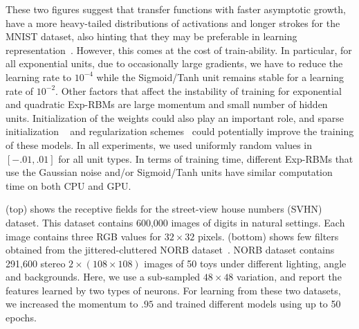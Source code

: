 \documentclass[twoside]{article}
\theoremstyle{plain}
\theoremstyle{definition}
\theoremstyle{remark}
\newcommand{\eg}[0]{\emph{e.g.},~}
\begin{document}
These two figures suggest that transfer functions with faster asymptotic growth, have a more heavy-tailed distributions of
activations and longer strokes for the MNIST dataset, also hinting that they may be preferable
in learning representation~\citep[\eg see][]{olshausen1997sparse}. However, this comes at the cost of train-ability.
In particular, for all exponential units, due to occasionally large gradients, we have to reduce the learning rate to $10^{-4}$ while the Sigmoid/Tanh unit remains stable for a learning rate of $10^{-2}$. Other factors that affect the instability of training for exponential and quadratic Exp-RBMs are large momentum and small number of hidden units. Initialization of the weights could also play an important role, and sparse initialization
 ~\citep{sutskever2013importance,martens2010deep} and regularization schemes~\citep{goodfellow2013maxout} could potentially improve the training of these models. In all experiments, we used uniformly random values in $[-.01,.01]$ for all unit types.
In terms of training time, different Exp-RBMs that use the Gaussian noise and/or Sigmoid/Tanh units have similar computation time on both CPU and GPU.


(top) shows the receptive fields for the street-view house numbers (SVHN)~\citep{netzer2011reading} dataset. This dataset contains 600,000 images of digits in natural settings. Each image contains three RGB values for
$32 \times 32$ pixels. (bottom) shows few filters obtained from
the jittered-cluttered NORB dataset~\citep{lecun2004learning}. NORB dataset contains 291,600 stereo $2 \times (108 \times 108)$ images of 50 toys under different lighting, angle and backgrounds. Here, we use a sub-sampled $48 \times 48$ variation, and report the features learned by two types of neurons. For learning from these two datasets, we increased the momentum to $.95$ and trained different models using up to 50 epochs. 


\end{document}
